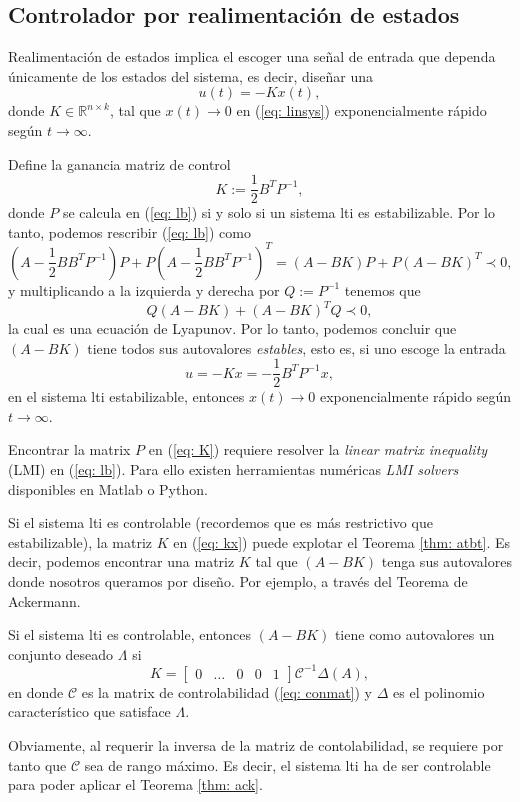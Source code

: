 \subsection{Controlador por realimentación de estados}\label{sec: realk}
Realimentación de estados implica el escoger una señal de entrada que dependa únicamente de los estados del sistema, es decir, diseñar una
\begin{equation}
u(t) = -Kx(t),
	\label{eq: kx}
\end{equation}
donde $K\in\mathbb{R}^{n\times k}$, tal que $x(t) \to 0$ en (\ref{eq: linsys}) exponencialmente rápido según $t\to\infty$.

Define la ganancia matriz de control
\begin{equation}
	K:=\frac{1}{2}B^TP^{-1}, \label{eq: K}
\end{equation}
donde $P$ se calcula en (\ref{eq: lb}) si y solo si un sistema lti es estabilizable. Por lo tanto, podemos rescribir (\ref{eq: lb}) como
\begin{equation}
	(A - \frac{1}{2}BB^TP^{-1})P + P(A - \frac{1}{2}BB^TP^{-1})^T = (A-BK)P+P(A-BK)^T \prec 0,
\end{equation}
y multiplicando a la izquierda y derecha por $Q:=P^{-1}$ tenemos que
\begin{equation}
	Q(A-BK)+(A-BK)^TQ \prec 0,
\end{equation}
la cual es una ecuación de Lyapunov. Por lo tanto, podemos concluir que $(A-BK)$ tiene todos sus autovalores \emph{estables}, esto es, si uno escoge la entrada
\begin{equation}
	u = -Kx = -\frac{1}{2}B^TP^{-1}x, \label{eq: conK}
\end{equation}
en el sistema lti estabilizable, entonces $x(t) \to 0$ exponencialmente rápido según $t\to\infty$.

Encontrar la matrix $P$ en (\ref{eq: K}) requiere resolver la \emph{linear matrix inequality} (LMI) en (\ref{eq: lb}). Para ello existen herramientas numéricas \emph{LMI solvers} disponibles en Matlab o Python.

Si el sistema lti es controlable (recordemos que es más restrictivo que estabilizable), la matriz $K$ en (\ref{eq: kx}) puede explotar el Teorema \ref{thm: atbt}. Es decir, podemos encontrar una matriz $K$ tal que $(A-BK)$ tenga sus autovalores donde nosotros queramos por diseño. Por ejemplo, a través del Teorema de Ackermann.
\begin{theorem}
	\label{thm: ack}
	Si el sistema lti es controlable, entonces $(A-BK)$ tiene como autovalores un conjunto deseado $\Lambda$ si
	\begin{equation}
		K = \begin{bmatrix}0 & \dots & 0 & 0 & 1\end{bmatrix}\mathcal{C}^{-1} \Delta(A),
	\end{equation}
	en donde $\mathcal{C}$ es la matrix de controlabilidad (\ref{eq: conmat}) y $\Delta$ es el polinomio característico que satisface $\Lambda$.
\end{theorem}
Obviamente, al requerir la inversa de la matriz de contolabilidad, se requiere por tanto que $\mathcal{C}$ sea de rango máximo. Es decir, el sistema lti ha de ser controlable para poder aplicar el Teorema \ref{thm: ack}.


